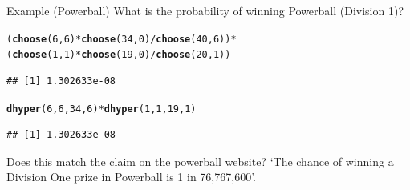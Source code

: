 \documentclass[t,xcolor=pdftex,dvipsnames,table]{beamer}\usepackage[]{graphicx}\usepackage[]{color}
\makeatletter
\newcommand{\hlnum}[1]{\textcolor[rgb]{0.686,0.059,0.569}{#1}}%
\newcommand{\hlopt}[1]{\textcolor[rgb]{0,0,0}{#1}}%
\newcommand{\hlstd}[1]{\textcolor[rgb]{0.345,0.345,0.345}{#1}}%
\newcommand{\hlkwd}[1]{\textcolor[rgb]{0.737,0.353,0.396}{\textbf{#1}}}%
\newenvironment{kframe}{%
 \def\at@end@of@kframe{}%
 \ifinner\ifhmode%
  \def\at@end@of@kframe{\end{minipage}}%
  \begin{minipage}{\columnwidth}%
 \fi\fi%
 \def\FrameCommand##1{\hskip\@totalleftmargin \hskip-\fboxsep
 \colorbox{shadecolor}{##1}\hskip-\fboxsep
     \hskip-\linewidth \hskip-\@totalleftmargin \hskip\columnwidth}%
 \MakeFramed {\advance\hsize-\width
   \@totalleftmargin\z@ \linewidth\hsize
   \@setminipage}}%
 {\par\unskip\endMakeFramed%
 \at@end@of@kframe}
\newenvironment{knitrout}{}{} %
\makeatother
\begin{document}
\begin{frame}[fragile]{}
\begin{block}{Example (Powerball)}
What is the probability of winning Powerball (Division 1)?  
\end{block}

\begin{knitrout}
\color{fgcolor}\begin{kframe}
\begin{alltt}
\hlstd{(}\hlkwd{choose}\hlstd{(}\hlnum{6}\hlstd{,}\hlnum{6}\hlstd{)}\hlopt{*}\hlkwd{choose}\hlstd{(}\hlnum{34}\hlstd{,}\hlnum{0}\hlstd{)}\hlopt{/}\hlkwd{choose}\hlstd{(}\hlnum{40}\hlstd{,}\hlnum{6}\hlstd{))}\hlopt{*}
  \hlstd{(}\hlkwd{choose}\hlstd{(}\hlnum{1}\hlstd{,}\hlnum{1}\hlstd{)}\hlopt{*}\hlkwd{choose}\hlstd{(}\hlnum{19}\hlstd{,}\hlnum{0}\hlstd{)}\hlopt{/}\hlkwd{choose}\hlstd{(}\hlnum{20}\hlstd{,}\hlnum{1}\hlstd{))}
\end{alltt}
\begin{verbatim}
## [1] 1.302633e-08
\end{verbatim}
\end{kframe}
\end{knitrout}

\begin{knitrout}
\color{fgcolor}\begin{kframe}
\begin{alltt}
\hlkwd{dhyper}\hlstd{(}\hlnum{6}\hlstd{,}\hlnum{6}\hlstd{,}\hlnum{34}\hlstd{,}\hlnum{6}\hlstd{)}\hlopt{*}\hlkwd{dhyper}\hlstd{(}\hlnum{1}\hlstd{,}\hlnum{1}\hlstd{,}\hlnum{19}\hlstd{,}\hlnum{1}\hlstd{)}
\end{alltt}
\begin{verbatim}
## [1] 1.302633e-08
\end{verbatim}
\end{kframe}
\end{knitrout}

\vspace{.5cm}
Does this match the claim on the powerball website?
`The chance of winning a Division One prize in Powerball is 1 in 76,767,600'.
\href{https://www.ozlotteries.com/play/powerball}{}

\end{frame}
\end{document}

